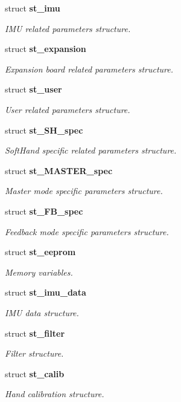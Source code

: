 \begin{DoxyCompactItemize}
struct \textbf{ st\+\_\+imu}
\begin{DoxyCompactList}\small\item\em I\+MU related parameters structure. \end{DoxyCompactList}\item 
struct \textbf{ st\+\_\+expansion}
\begin{DoxyCompactList}\small\item\em Expansion board related parameters structure. \end{DoxyCompactList}\item 
struct \textbf{ st\+\_\+user}
\begin{DoxyCompactList}\small\item\em User related parameters structure. \end{DoxyCompactList}\item 
struct \textbf{ st\+\_\+\+S\+H\+\_\+spec}
\begin{DoxyCompactList}\small\item\em Soft\+Hand specific related parameters structure. \end{DoxyCompactList}\item 
struct \textbf{ st\+\_\+\+M\+A\+S\+T\+E\+R\+\_\+spec}
\begin{DoxyCompactList}\small\item\em Master mode specific parameters structure. \end{DoxyCompactList}\item 
struct \textbf{ st\+\_\+\+F\+B\+\_\+spec}
\begin{DoxyCompactList}\small\item\em Feedback mode specific parameters structure. \end{DoxyCompactList}\item 
struct \textbf{ st\+\_\+eeprom}
\begin{DoxyCompactList}\small\item\em Memory variables. \end{DoxyCompactList}\item 
struct \textbf{ st\+\_\+imu\+\_\+data}
\begin{DoxyCompactList}\small\item\em I\+MU data structure. \end{DoxyCompactList}\item 
struct \textbf{ st\+\_\+filter}
\begin{DoxyCompactList}\small\item\em Filter structure. \end{DoxyCompactList}\item 
struct \textbf{ st\+\_\+calib}
\begin{DoxyCompactList}\small\item\em Hand calibration structure. \end{DoxyCompactList}\end{DoxyCompactItemize}
